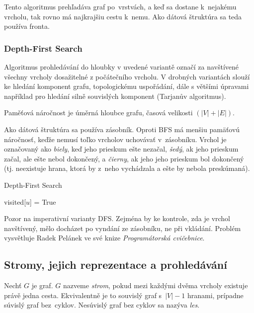 Tento algoritmus prehľadáva graf po~vrstvách, a keď sa dostane k~nejakému vrcholu,
tak rovno má najkrajšiu cestu k~nemu. Ako dátová štruktúra sa teda používa
fronta.

\subsubsection*{Depth-First Search}

Algoritmus prohledávání do hloubky v uvedené variantě označí za
navštívené všechny vrcholy dosažitelné z počátečního vrcholu. V drobných
variantách slouží ke hledání komponent grafu, topologickému uspořádání,
dále s většími úpravami například pro hledání silně souvislých komponent
(Tarjanův algoritmus).

Paměťová náročnost je úměrná hloubce grafu, časová velikosti
$(\lvert V \rvert + \lvert E \rvert)$.

Ako dátová štruktúra sa používa zásobník. Oproti BFS má menšiu pamäťovú 
náročnosť, keďže nemusí toľko vrcholov uchovávať v~zásobníku.
Vrchol je označovaný ako {\em biely}, keď jeho prieskum ešte nezačal,
{\em šedý}, ak jeho prieskum začal, ale ešte nebol dokončený, a {\em čierny},
ak jeho jeho prieskum bol dokončený (tj. neexistuje hrana, ktorá by z~neho
vychádzala a ešte by nebola preskúmaná).

\begin{algorithm}
\caption{Depth-First Search}
\begin{algorithmic}[1]
    \State visited[$u$] = True
            \State {}
        \EndIf
    \EndFor
\EndFunction
\end{algorithmic}
\end{algorithm}

Pozor na  imperativní varianty DFS. Zejména by ke kontrole,
zda je vrchol navštívený, mělo docházet po vyndání ze zásobníku, ne při
vkládání.
Problém vysvětluje Radek Pelánek ve své knize {\em Programátorská
cvičebnice}.

\subsection{Stromy, jejich reprezentace a prohledávání}

Nechť $G$ je graf. $G$ nazveme {\em strom}, pokud mezi každými dvěma
vrcholy existuje právě jedna cesta. Ekvivalentně je to souvislý graf
s~$\lvert V \rvert - 1$ hranami, prípadne súvislý graf bez~cyklov. 
Nesúvislý graf bez cyklov sa nazýva {\em les}. 

